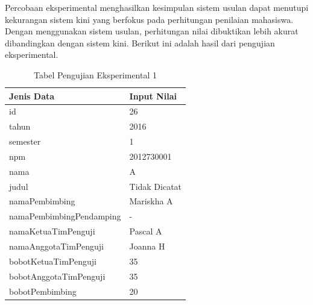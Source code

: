 	Percobaan eksperimental menghasilkan kesimpulan sistem usulan dapat menutupi kekurangan sistem kini yang berfokus pada perhitungan penilaian mahasiswa. Dengan menggunakan sistem usulan, perhitungan nilai dibuktikan lebih akurat dibandingkan dengan sistem kini. Berikut ini adalah hasil dari pengujian eksperimental.
	\begin{table}[H]
		\centering
		\caption{Tabel Pengujian Eksperimental 1}
		\begin{tabular}{| m{7cm} | m{5cm} |}
			\hline
			Jenis Data & Input Nilai\\
			\hline
			id & 26\\
			\hline
			tahun & 2016\\
			\hline
			semester & 1\\
			\hline
			npm & 2012730001\\
			\hline
			nama & A\\
			\hline
			judul & Tidak Dicatat \\
			\hline
			namaPembimbing & Mariskha A\\
			\hline
			namaPembimbingPendamping & -\\
			\hline
			namaKetuaTimPenguji & Pascal A\\
			\hline
			namaAnggotaTimPenguji & Joanna H\\
			\hline
			bobotKetuaTimPenguji & 35\\
			\hline
			bobotAnggotaTimPenguji & 35\\
			\hline
			bobotPembimbing & 20\\
			\hline
		\end{tabular}
	\end{table}
